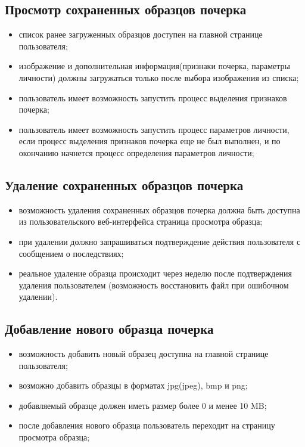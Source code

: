 \subsection{Просмотр сохраненных образцов почерка}
\label{sec:freq:show}
\begin{itemize}
	\item список ранее загруженных образцов доступен на главной странице пользователя;
	\item изображение и дополнительная информация(признаки почерка, параметры личности) должны загружаться только после выбора изображения из списка;
	\item пользователь имеет возможность запустить процесс выделения признаков почерка;
	\item пользователь имеет возможность запустить процесс параметров личности, если процесс выделения признаков почерка еще не был выполнен, и по окончанию начнется процесс определения параметров личности;
\end{itemize}

\subsection{Удаление сохраненных образцов почерка}
\label{sec:freq:delete}
\begin{itemize}
	\item возможность удаления сохраненных образцов почерка должна быть доступна из пользовательского веб-интерфейса страница просмотра образца;
	\item при удалении должно запрашиваться подтверждение действия пользователя с сообщением о последствиях;
	\item реальное удаление образца происходит через неделю после подтверждения удаления пользователем (возможность восстановить файл при ошибочном удалении).
\end{itemize}

\subsection{Добавление нового образца почерка}
\label{sec:freq:add}
\begin{itemize}
	\item возможность добавить новый образец доступна на главной странице пользователя;
	\item возможно добавить образцы в форматах jpg(jpeg), bmp и png;
	\item добавляемый образце должен иметь размер более 0 и менее 10 MB;
	\item после добавления нового образца пользователь переходит на страницу просмотра образца;
\end{itemize}

